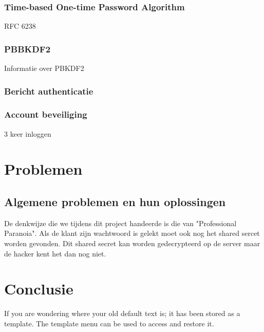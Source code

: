 \documentclass[11pt]{article}
\begin{document}
\subsubsection{Time-based One-time Password Algorithm}
\label{sec:totp}
RFC 6238

\subsubsection{PBBKDF2}
\label{sec:pbkdf2}
Informatie over PBKDF2

\subsubsection{Bericht authenticatie}
\label{sec:mac}

\subsubsection{Account beveiliging}
\label{sec:bev}
3 keer inloggen
\section{Problemen}
\subsection{Algemene problemen en hun oplossingen}
De denkwijze die we tijdens dit project handeerde is die van "Professional Paranoia".
Als de klant zijn wachtwoord is gelekt moet ook nog het shared sercet worden gevonden. Dit shared secret kan worden gedecrypteerd op de server maar de hacker kent het dan nog niet.
\section{Conclusie}
If you are wondering where your old default text is; it has been stored as a template. The template menu can be used to access and restore it. 

{}

\end{document}
